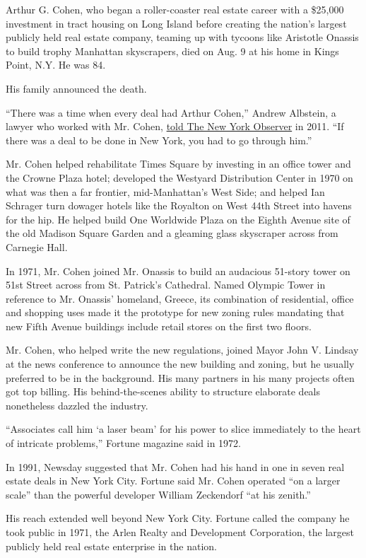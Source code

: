 Arthur G. Cohen, who began a roller-coaster real estate career with a
\$25,000 investment in tract housing on Long Island before creating the
nation's largest publicly held real estate company, teaming up with
tycoons like Aristotle Onassis to build trophy Manhattan skyscrapers,
died on Aug. 9 at his home in Kings Point, N.Y. He was 84.

His family announced the death.

``There was a time when every deal had Arthur Cohen,'' Andrew Albstein,
a lawyer who worked with Mr. Cohen,
\href{http://observer.com/2011/06/the-property-pretenders/}{told The New
York Observer} in 2011. ``If there was a deal to be done in New York,
you had to go through him.''

Mr. Cohen helped rehabilitate Times Square by investing in an office
tower and the Crowne Plaza hotel; developed the Westyard Distribution
Center in 1970 on what was then a far frontier, mid-Manhattan's West
Side; and helped Ian Schrager turn dowager hotels like the Royalton on
West 44th Street into havens for the hip. He helped build One Worldwide
Plaza on the Eighth Avenue site of the old Madison Square Garden and a
gleaming glass skyscraper across from Carnegie Hall.

In 1971, Mr. Cohen joined Mr. Onassis to build an audacious 51-story
tower on 51st Street across from St. Patrick's Cathedral. Named Olympic
Tower in reference to Mr. Onassis' homeland, Greece, its combination of
residential, office and shopping uses made it the prototype for new
zoning rules mandating that new Fifth Avenue buildings include retail
stores on the first two floors.

Mr. Cohen, who helped write the new regulations, joined Mayor John V.
Lindsay at the news conference to announce the new building and zoning,
but he usually preferred to be in the background. His many partners in
his many projects often got top billing. His behind-the-scenes ability
to structure elaborate deals nonetheless dazzled the industry.

``Associates call him `a laser beam' for his power to slice immediately
to the heart of intricate problems,'' Fortune magazine said in 1972.

In 1991, Newsday suggested that Mr. Cohen had his hand in one in seven
real estate deals in New York City. Fortune said Mr. Cohen operated ``on
a larger scale'' than the powerful developer William Zeckendorf ``at his
zenith.''

His reach extended well beyond New York City. Fortune called the company
he took public in 1971, the Arlen Realty and Development Corporation,
the largest publicly held real estate enterprise in the nation.

